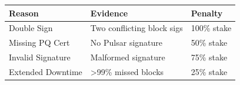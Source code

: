 \begin{table}[h]
\centering
\begin{tabular}{@{}lll@{}}
\toprule
\textbf{Reason} & \textbf{Evidence} & \textbf{Penalty} \\
\midrule
Double Sign & Two conflicting block sigs & 100\% stake \\
Missing PQ Cert & No Pulsar signature & 50\% stake \\
Invalid Signature & Malformed signature & 75\% stake \\
Extended Downtime & >99\% missed blocks & 25\% stake \\
\bottomrule
\end{tabular}

\label{tab:slashing}
\end{table}

